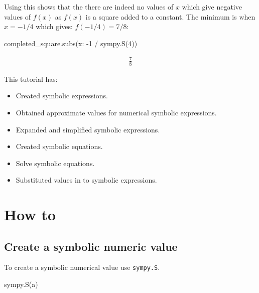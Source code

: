 \begin{pyin}
Using this shows that the there are indeed no values of \(x\) which give
negative values of \(f(x)\) as \(f(x)\) is a square added to a constant.
The minimum is when \(x=-1/4\) which gives: \(f(-1/4)=7/8\):

\begin{pyin}
completed_square.subs({x: -1 / sympy.S(4)})
\end{pyin}

\begin{equation*}
\begin{split}\displaystyle \frac{7}{8}\end{split}
\end{equation*}

This tutorial has:
\begin{itemize}
\item 

Created symbolic expressions.

\item 

Obtained approximate values for numerical symbolic expressions.

\item 

Expanded and simplified symbolic expressions.

\item 

Created symbolic equations.

\item 

Solve symbolic equations.

\item 

Substituted values in to symbolic expressions.

\end{itemize}

\section{How to}

\subsection{Create a symbolic numeric value}

To create a symbolic numerical value use \texttt{sympy.S}.

\begin{pyin}
sympy.S(a)
\end{pyin}



\end{pyin}
